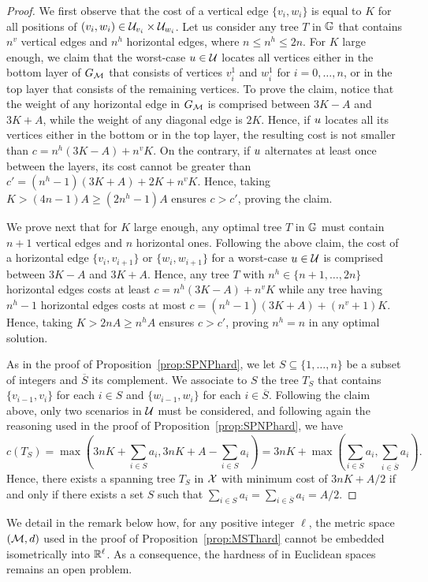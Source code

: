 \documentclass[12pt]{article}
\begin{document}
\begin{proof}
We first observe that the cost of a vertical edge $\{v_i,w_i\}$ is equal to $K$ for all positions of $(v_i,w_i)\in\mathcal{U}_{v_i}\times \mathcal{U}_{w_i}$. Let us consider any tree $T$ in $\mathbb{G}$ that contains $n^v$ vertical edges and $n^h$ horizontal edges, where $n \leq n^h\leq 2n$. For $K$ large enough, we claim that the worst-case $u\in\mathcal{U}$ locates all vertices either in the bottom layer of $G_{\mathcal{M}}$ that consists of vertices $v^1_i$ and $w^1_i$ for  $i=0,\ldots,n$, or in the top layer that consists of the remaining vertices. To prove the claim, notice that the weight of any horizontal edge in $G_{\mathcal{M}}$ is comprised between $3K-A$ and $3K+A$, while the weight of any diagonal edge is $2K$. Hence, if $u$ locates all its vertices either in the bottom or in the top layer, the resulting cost is not smaller than $c=n^h(3K-A)+n^vK$. On the contrary, if $u$ alternates at least once between the layers, its cost cannot be greater than $c'=(n^h-1)(3K+A)+2K+n^vK$. Hence, taking $K>(4n-1)A\geq(2n^h-1)A$ ensures $c>c'$, proving the claim.

We prove next that for $K$ large enough, any optimal tree $T$ in $\mathbb{G}$ must contain $n + 1$ vertical edges and $n$ horizontal ones. Following the above claim, the cost of a horizontal edge $\{v_i,v_{i+1}\}$ or $\{w_i,w_{i+1}\}$ for a worst-case $u\in\mathcal{U}$ is comprised between $3K-A$ and $3K+A$. Hence, any tree $T$ with $n^h\in\{n+1,\ldots,2n\}$ horizontal edges costs at least $c=n^h(3K-A)+n^vK$ while any tree having $n^h-1$ horizontal edges costs at most $c=(n^h-1)(3K+A)+(n^v+1)K$. Hence, taking $K>2nA\geq n^hA$ ensures $c>c'$, proving $n^h=n$ in any optimal solution. 

As in the proof of Proposition~\ref{prop:SPNPhard}, we let $S\subseteq\{1,\ldots,n\}$ be a subset of integers and $\overline{S}$ its complement. We associate to $S$ the tree $T_S$ that contains $\{v_{i-1},v_i\}$ for each $i\in S$ and $\{w_{i-1},w_i\}$ for each $i\in\overline{S}$. Following the claim above, only two scenarios in $\mathcal{U}$ must be considered, and following again the reasoning used in the proof of Proposition~\ref{prop:SPNPhard}, we have
$$
c(T_S) = \max\left(3nK+\sum_{i\in S}a_i,3nK+A-\sum_{i\in S}a_i\right) 
=3nK + \max\left(\sum_{i\in S}a_i,\sum_{i\in \overline{S}}a_i\right).
$$
Hence, there exists a spanning tree $T_S$ in $\mathcal{X}$ with minimum cost of $3nK+A/2$ if and only if there exists a set $S$ such that $\sum_{i\in S} a_i = \sum_{i\in \overline{S}} a_i=A/2$. 
\end{proof}

We detail in the remark below how, for any positive integer $\ell$, the metric space $(\mathcal{M},d)$ used in the proof of Proposition~\ref{prop:MSThard} cannot be embedded isometrically into $\mathbb{R}^\ell$. 
As a consequence, the hardness of   in Euclidean spaces remains an open problem.
\end{document}
